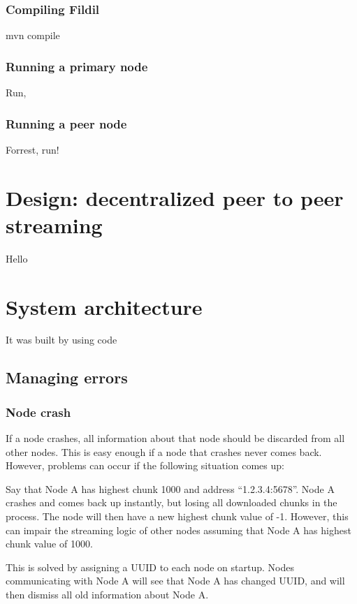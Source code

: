 \documentclass[10pt, a4paper]{article}
\begin{document}
\subsubsection{Compiling Fildil}

mvn compile

\subsubsection{Running a primary node}

Run,

\subsubsection{Running a peer node}

Forrest, run!

\section{Design: decentralized peer to peer streaming}
\label{sec:design}

Hello

\section{System architecture}
\label{sec:system}

It was built by using code

\subsection{Managing errors}

\subsubsection{Node crash}
If a node crashes, all information about that node should be discarded from all
other nodes. This is easy enough if a node that crashes never comes
back. However, problems can occur if the following situation comes up:

Say that Node A has highest chunk 1000 and address ``1.2.3.4:5678''. Node A
crashes and comes back up instantly, but losing all downloaded chunks in the
process. The node will then have a new highest chunk value of -1. However, this
can impair the streaming logic of other nodes assuming that Node A has highest
chunk value of 1000.

This is solved by assigning a UUID to each node on startup. Nodes communicating
with Node A will see that Node A has changed UUID, and will then dismiss all old
information about Node A.
\end{document}
